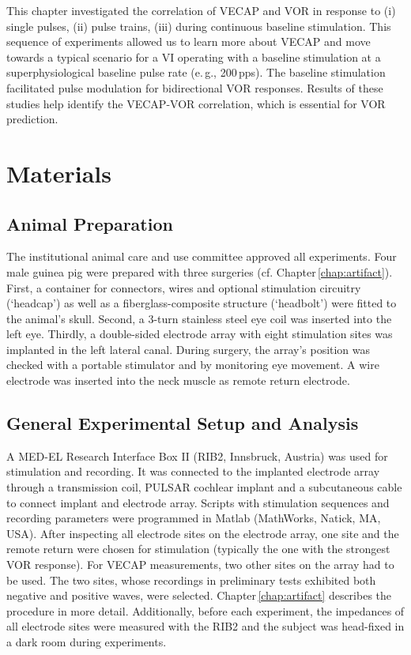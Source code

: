 This chapter investigated the correlation of VECAP and VOR in response to (i) single pulses, (ii) pulse trains, (iii) during continuous baseline stimulation. This sequence of experiments allowed us to learn more about VECAP and move towards a typical scenario for a VI operating with a baseline stimulation at a superphysiological baseline pulse rate (e.\,g., 200\,pps). The baseline stimulation facilitated pulse modulation for bidirectional VOR responses. Results of these studies help identify the VECAP-VOR correlation, which is essential for VOR prediction.

\section{Materials}
\subsection{Animal Preparation}
The institutional animal care and use committee approved all experiments. Four male guinea pig were prepared with three surgeries (cf. Chapter\,\ref{chap:artifact}). First, a container for connectors, wires and optional stimulation circuitry (‘headcap’) as well as a fiberglass-composite structure (‘headbolt’) were fitted to the animal’s skull. Second, a 3-turn stainless steel eye coil was inserted into the left eye. Thirdly, a double-sided electrode array with eight stimulation sites was implanted in the left lateral canal. During surgery, the array’s position was checked with a portable stimulator and by monitoring eye movement. A wire electrode was inserted into the neck muscle as remote return electrode.

\subsection{General Experimental Setup and Analysis}
A MED-EL Research Interface Box II (RIB2, Innsbruck, Austria) was used for stimulation and recording. It was connected to the implanted electrode array through a transmission coil, PULSAR cochlear implant and a subcutaneous cable to connect implant and electrode array. Scripts with stimulation sequences and recording parameters were programmed in Matlab (MathWorks, Natick, MA, USA). After inspecting all electrode sites on the electrode array, one site and the remote return were chosen for stimulation (typically the one with the strongest VOR response). For VECAP measurements, two other sites on the array had to be used. The two sites, whose recordings in preliminary tests exhibited both negative and positive waves, were selected. Chapter\,\ref{chap:artifact} describes the procedure in more detail. Additionally, before each experiment, the impedances of all electrode sites were measured with the RIB2 and the subject was head-fixed in a dark room during experiments.

